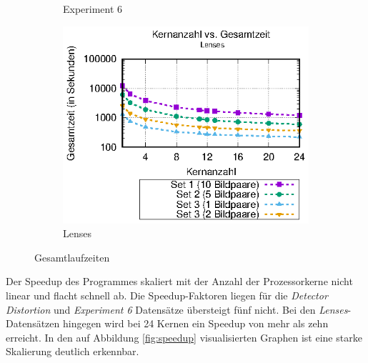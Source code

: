 \begin{center}
\begin{figure}[htbp]
\begin{subfigure}[b]{0.325\textwidth}
			\caption[Experiment 6]{Experiment 6}
			\label{fig:times_exp6}
		\end{subfigure}
		\hfill
		\begin{subfigure}[b]{0.325\textwidth}
			\centering
			\includegraphics[width=\textwidth]{pdf/times_lenses}
			\caption[Lenses]{Lenses}
			\label{fig:times_lenses}
		\end{subfigure}
		\caption{Gesamtlaufzeiten}
		\label{fig:gesamtlaufzeiten}
	\end{figure}
\end{center}

Der Speedup des Programmes skaliert mit der Anzahl der Prozessorkerne nicht linear und flacht schnell ab. Die Speedup-Faktoren liegen für die \textit{Detector Distortion} und \textit{Experiment 6} Datensätze übersteigt fünf nicht. Bei den \textit{Lenses}-Datensätzen hingegen wird bei 24 Kernen ein Speedup von mehr als zehn erreicht. In den auf Abbildung \ref{fig:speedup} visualisierten Graphen ist eine starke Skalierung deutlich erkennbar. 

